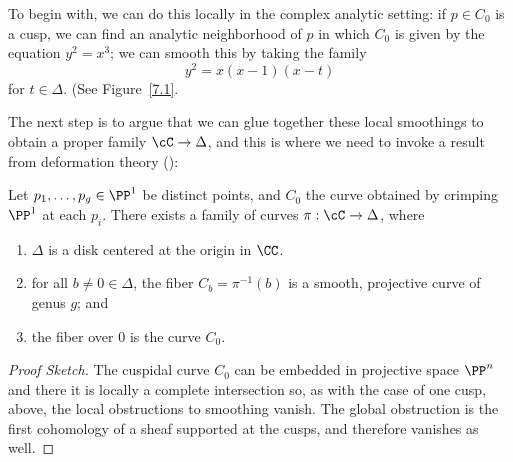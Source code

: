 To begin with, we can do this locally in the complex analytic setting: if $p \in C_0$ is a cusp, we can find an analytic neighborhood of $p$ in which $C_0$ is given by the equation $y^2 = x^3$; we can smooth this by taking the family
$$
y^2 = x(x-1)(x-t)
$$
for $t\in \Delta$.
(See Figure~\ref{7.1}.

The next step is to argue that we can glue together these local smoothings to obtain a proper family $\cC \to \Delta$, and this is where we need to invoke a result from deformation theory (\cite{MR2223408}):

\begin{lemma}\label{specialization to cuspidal curve}
Let $p_1,\dots,p_g \in \PP^1$ be distinct points, and $C_0$ the curve obtained by 
crimping $\PP^1$ at each $p_i$. There exists a family of curves $\pi : \cC \to \Delta$, where
\begin{enumerate}
\item $\Delta$ is a disk centered at the origin in $\CC$.
\item for all $b \neq 0 \in \Delta$, the fiber $C_b = \pi^{-1}(b)$ is a smooth, projective curve of genus $g$;  and
\item the fiber over $0$ is the curve $C_0$.
\end{enumerate}
\end{lemma}

\begin{proof}[Proof Sketch]
The cuspidal curve $C_{0}$ can be embedded in projective space $\PP^{n}$ and there
it is locally a complete intersection so, as with the case of one cusp, above, the local obstructions
to smoothing vanish. The global obstruction is the first cohomology of a sheaf supported at the cusps,
and therefore vanishes as well.
\end{proof}


